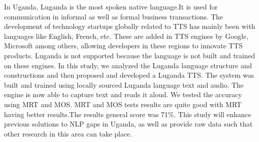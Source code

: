 In Uganda, Luganda is the most spoken native language.It is used for communication in informal as well as formal business transactions. The development of technology startups globally related to TTS has mainly been with languages like English, French, etc. These are added in TTS engines by Google, Microsoft among others, allowing developers in these regions to innovate TTS products. Luganda is not supported because the language is not built and trained on these engines. In this study, we analyzed the Luganda language structure and constructions and then proposed and developed a Luganda TTS. The system was built and trained using locally sourced Luganda language text and audio. The engine is now able to capture text and reads it aloud. We tested the accuracy using MRT and MOS. MRT and MOS tests results are quite good with MRT having better results.The results general score was 71\%. This study will enhance previous solutions to NLP gaps in Uganda, as well as provide raw data such that other research in this area can take place.
